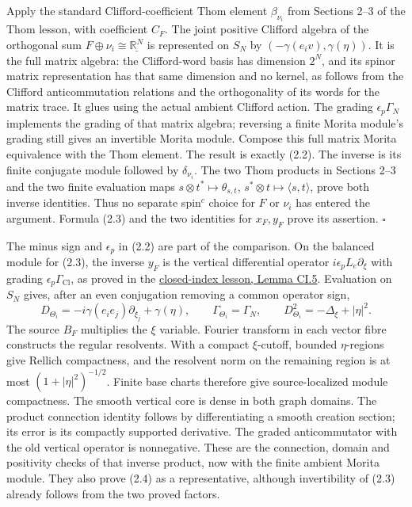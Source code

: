\documentclass[
  11pt,
]{article}
\begin{document}
Apply the standard Clifford-coefficient Thom element \(\beta_{\nu_i}\)
from Sections 2--3 of the Thom lesson, with coefficient \(C_F\). The
joint positive Clifford algebra of the orthogonal sum
\(F\oplus\nu_i\cong\underline{\mathbb R^N}\) is represented on \(S_N\)
by \((-\gamma(e_iv),\gamma(\eta))\). It is the full matrix algebra: the
Clifford-word basis has dimension \(2^N\), and its spinor matrix
representation has that same dimension and no kernel, as follows from
the Clifford anticommutation relations and the orthogonality of its
words for the matrix trace. It glues using the actual ambient Clifford
action. The grading \(\epsilon_p\Gamma_N\) implements the grading of
that matrix algebra; reversing a finite Morita module's grading still
gives an invertible Morita module. Compose this full matrix Morita
equivalence with the Thom element. The result is exactly (2.2). The
inverse is its finite conjugate module followed by \(\delta_{\nu_i}\).
The two Thom products in Sections 2--3 and the two finite evaluation
maps \(s\otimes t^*\mapsto\theta_{s,t}\),
\(s^*\otimes t\mapsto\langle s,t\rangle\), prove both inverse
identities. Thus no separate spin\(^{c}\) choice for \(F\) or \(\nu_i\)
has entered the argument. Formula (2.3) and the two identities for
\(x_F,y_F\) prove its assertion. \(\square\)

The minus sign and \(\epsilon_p\) in (2.2) are part of the comparison.
On the balanced module for (2.3), the inverse \(y_F\) is the vertical
differential operator \(i\epsilon_p L_e\partial_\xi\) with grading
\(\epsilon_p\Gamma_{\mathrm{Cl}}\), as proved in the
\href{KT-KK-15.html\#5-the-clifford-inverse-and-the-two-cotangent-conventions}{closed-index
lesson, Lemma CI.5}. Evaluation on \(S_N\) gives, after an even
conjugation removing a common operator sign, \[
 D_{\Theta_i}=-i\gamma(e_i e_j)\partial_{\xi_j}+\gamma(\eta),
 \qquad\Gamma_{\Theta_i}=\Gamma_N,
 \qquad D_{\Theta_i}^2=-\Delta_\xi+|\eta|^2.
 \tag{2.4}
\] The source \(B_F\) multiplies the \(\xi\) variable. Fourier transform
in each vector fibre constructs the regular resolvents. With a compact
\(\xi\)-cutoff, bounded \(\eta\)-regions give Rellich compactness, and
the resolvent norm on the remaining region is at most
\((1+|\eta|^2)^{-1/2}\). Finite base charts therefore give
source-localized module compactness. The smooth vertical core is dense
in both graph domains. The product connection identity follows by
differentiating a smooth creation section; its error is its compactly
supported derivative. The graded anticommutator with the old vertical
operator is nonnegative. These are the connection, domain and positivity
checks of that inverse product, now with the finite ambient Morita
module. They also prove (2.4) as a representative, although
invertibility of (2.3) already follows from the two proved factors.
\end{document}
